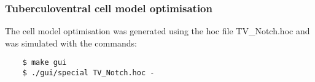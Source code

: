 \newpage
%



\subsubsection[TV cell model]{Tuberculoventral cell model optimisation}    \label{sec:APDX:tuberc-cell-model}

The \TV cell model optimisation was generated using the hoc file \textsf{TV\_Notch.hoc} and was simulated with the commands: 
\begin{verbatim}
    $ make gui
    $ ./gui/special TV_Notch.hoc -
\end{verbatim}



